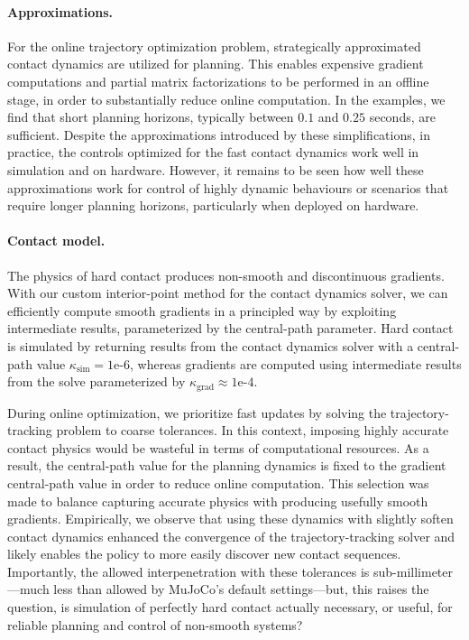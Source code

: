 \paragraph{Approximations.} 
For the online trajectory optimization problem, strategically approximated contact dynamics are utilized for planning. This enables expensive gradient computations and partial matrix factorizations to be performed in an offline stage, in order to substantially reduce online computation. In the examples, we find that short planning horizons, typically between $0.1$ and $0.25$ seconds, are sufficient. Despite the approximations introduced by these simplifications, in practice, the controls optimized for the fast contact dynamics work well in simulation and on hardware. However, it remains to be seen how well these approximations work for control of highly dynamic behaviours or scenarios that require longer planning horizons, particularly when deployed on hardware.

\paragraph{Contact model.} 
The physics of hard contact produces non-smooth and discontinuous gradients. With our custom interior-point method for the contact dynamics solver, we can efficiently compute smooth gradients in a principled way by exploiting intermediate results, parameterized by the central-path parameter. Hard contact is simulated by returning results from the contact dynamics solver with a central-path value $\kappa_{\mbox{sim}} = 1\mbox{e-}6$, whereas gradients are computed using intermediate results from the solve parameterized by $\kappa_{\mbox{grad}} \approx 1\mbox{e-}4$. 

During online optimization, we prioritize fast updates by solving the trajectory-tracking problem to coarse tolerances. In this context, imposing highly accurate contact physics would be wasteful in terms of computational resources. As a result, the central-path value for the planning dynamics is fixed to the gradient central-path value in order to reduce online computation. This selection was made to balance capturing accurate physics with producing usefully smooth gradients. Empirically, we observe that using these dynamics with slightly soften contact dynamics enhanced the convergence of the trajectory-tracking solver and likely enables the policy to more easily discover new contact sequences. Importantly, the allowed interpenetration with these tolerances is sub-millimeter---much less than allowed by MuJoCo's default settings---but, this raises the question, is simulation of perfectly hard contact actually necessary, or useful, for reliable planning and control of non-smooth systems?

